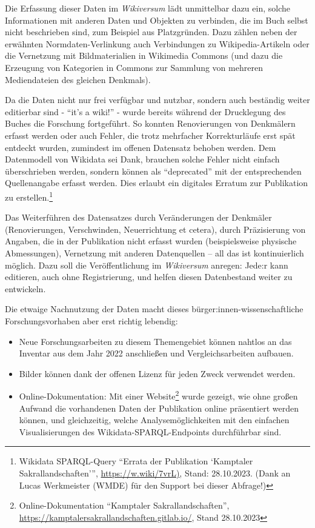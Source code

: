\documentclass[a4paper,
fontsize=11pt,
oneside,
numbers=noperiodatend,
parskip=half-,
bibliography=totoc,
final
]{scrartcl}
\begin{document}
Die Erfassung dieser Daten im \emph{Wikiversum} lädt unmittelbar dazu
ein, solche Informationen mit anderen Daten und Objekten zu verbinden,
die im Buch selbst nicht beschrieben sind, zum Beispiel aus
Platzgründen. Dazu zählen neben der erwähnten Normdaten-Verlinkung auch
Verbindungen zu Wikipedia-Artikeln oder die Vernetzung mit
Bildmaterialien in Wikimedia Commons (und dazu die Erzeugung von
Kategorien in Commons zur Sammlung von mehreren Mediendateien des
gleichen Denkmals).

Da die Daten nicht nur frei verfügbar und nutzbar, sondern auch
beständig weiter editierbar sind - \enquote{it's a wiki!} - wurde
bereits während der Drucklegung des Buches die Forschung fortgeführt. So
konnten Renovierungen von Denkmälern erfasst werden oder auch Fehler,
die trotz mehrfacher Korrekturläufe erst spät entdeckt wurden, zumindest
im offenen Datensatz behoben werden. Dem Datenmodell von Wikidata sei
Dank, brauchen solche Fehler nicht einfach überschrieben werden, sondern
können als \enquote{deprecated} mit der entsprechenden Quellenangabe
erfasst werden. Dies erlaubt ein digitales Erratum zur Publikation zu
erstellen.\footnote{Wikidata SPARQL-Query \enquote{Errata der
  Publikation \enquote*{Kamptaler Sakrallandschaften}},
  \url{https://w.wiki/7vrL)}, Stand: 28.10.2023. (Dank an Lucas
  Werkmeister (WMDE) für den Support bei dieser Abfrage!)}

Das Weiterführen des Datensatzes durch Veränderungen der Denkmäler
(Renovierungen, Verschwinden, Neuerrichtung et cetera), durch
Präzisierung von Angaben, die in der Publikation nicht erfasst wurden
(beispielsweise physische Abmessungen), Vernetzung mit anderen
Datenquellen -- all das ist kontinuierlich möglich. Dazu soll die
Veröffentlichung im \emph{Wikiversum} anregen: Jede:r kann editieren,
auch ohne Registrierung, und helfen diesen Datenbestand weiter zu
entwickeln.

Die etwaige Nachnutzung der Daten macht dieses
bürger:innen-wissenschaftliche Forschungsvorhaben aber erst richtig
lebendig:

\begin{itemize}
\item
  Neue Forschungsarbeiten zu diesem Themengebiet können nahtlos an das
  Inventar aus dem Jahr 2022 anschließen und Vergleichsarbeiten
  aufbauen.
\item
  Bilder können dank der offenen Lizenz für jeden Zweck verwendet
  werden.
\item
  Online-Dokumentation: Mit einer Website\footnote{Online-Dokumentation
    \enquote{Kamptaler Sakrallandschaften},
    \url{https://kamptalersakrallandschaften.gitlab.io/}, Stand
    28.10.2023} wurde gezeigt, wie ohne großen Aufwand die vorhandenen
  Daten der Publikation online präsentiert werden können, und
  gleichzeitig, welche Analysemöglichkeiten mit den einfachen
  Visualisierungen des Wikidata-SPARQL-Endpoints durchführbar sind.
\end{itemize}
\end{document}
